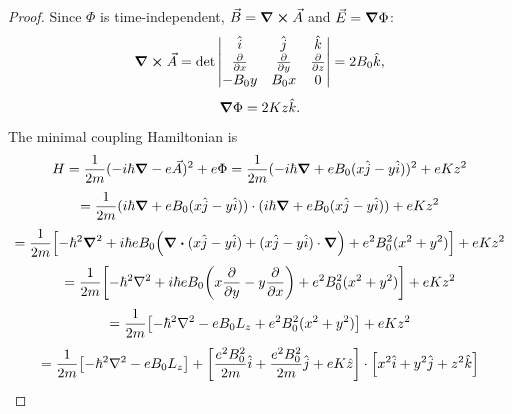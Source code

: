 \documentclass{article}
\begin{document}
\begin{proof}
  Since $\Phi$ is time-independent, $\vec{B} = \curl{\vec{A}}$ and $\vec{E} = \grad{\Phi}$:
  \[
    \curl{\vec{A}} = \det
    \begin{vmatrix}
      \hat{i} & \hat{j} & \hat{k} \\
      \pdv{x} & \pdv{y} & \pdv{z} \\
      -B_{0}y & B_{0}x & 0
    \end{vmatrix}
    = 2B_{0}\hat{k},
  \]
  \[
    \grad{\Phi} = 2Kz\hat{k}.
  \]

  The minimal coupling Hamiltonian is
  \[
    H = \frac{1}{2m}(-i\hbar\grad - e\vec{A})^{2} + e\Phi
    = \frac{1}{2m}(-i\hbar\grad + eB_{0}(x\hat{j} - y\hat{i}))^{2} + eKz^{2}
  \]
  \[
    = \frac{1}{2m}(i\hbar\grad + eB_{0}(x\hat{j} - y\hat{i})) \cdot (i\hbar\grad + eB_{0}(x\hat{j} - y\hat{i})) + eKz^{2}
  \]
  \[
    = \frac{1}{2m}\qty[-\hbar^{2}\grad^{2} + i\hbar eB_{0}\qty(\div{(x\hat{j} - y\hat{i})} + (x\hat{j} - y\hat{i}) \cdot \grad)
    + e^{2}B_{0}^{2}(x^{2} + y^{2})] + eKz^{2}
  \]
  \[
    = \frac{1}{2m}\qty[-\hbar^{2}\laplacian + i\hbar eB_{0}\qty(x\pdv{y} - y\pdv{x}) + e^{2}B_{0}^{2}(x^{2} + y^{2})] + eKz^{2}
  \]
  \[
    = \frac{1}{2m}\qty[-\hbar^{2}\laplacian - eB_{0}L_{z} + e^{2}B_{0}^{2}(x^{2} + y^{2})] + eKz^{2}
  \]
  \[
    = \frac{1}{2m}\qty[-\hbar^{2}\laplacian - eB_{0}L_{z}] + \qty[\frac{e^{2}B_{0}^{2}}{2m}\hat{i} + \frac{e^{2}B_{0}^{2}}{2m}\hat{j} + eK\hat{z}]
    \cdot \qty[x^{2}\hat{i} + y^{2}\hat{j} + z^{2}\hat{k}]
  \]


\end{proof}
\end{document}

